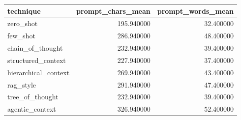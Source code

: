 \begin{tabular}{lrr}
\toprule
technique & prompt_chars_mean & prompt_words_mean \\
\midrule
zero_shot & 195.940000 & 32.400000 \\
few_shot & 286.940000 & 48.400000 \\
chain_of_thought & 232.940000 & 39.400000 \\
structured_context & 227.940000 & 37.400000 \\
hierarchical_context & 269.940000 & 43.400000 \\
rag_style & 291.940000 & 47.400000 \\
tree_of_thought & 232.940000 & 39.400000 \\
agentic_context & 326.940000 & 52.400000 \\
\bottomrule
\end{tabular}
